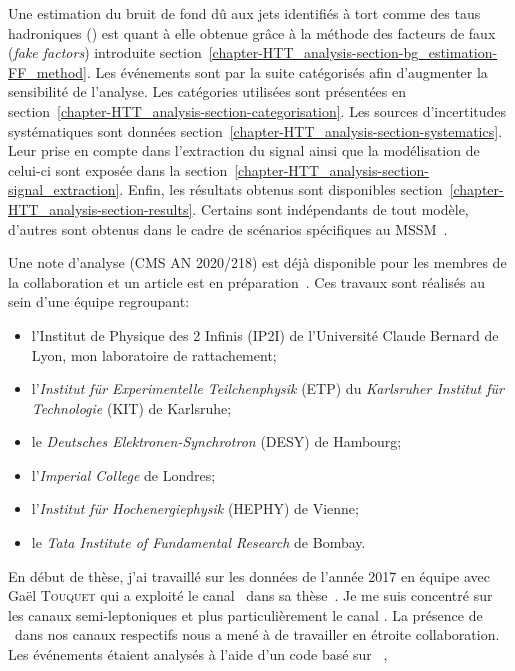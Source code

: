 Une estimation du bruit de fond dû aux jets identifiés à tort comme des taus hadroniques (\ftauhs) est quant à elle obtenue grâce à la méthode des facteurs de faux (\emph{fake factors}) introduite section~\ref{chapter-HTT_analysis-section-bg_estimation-FF_method}.
Les événements sont par la suite catégorisés afin d'augmenter la sensibilité de l'analyse.
Les catégories utilisées sont présentées en section~\ref{chapter-HTT_analysis-section-categorisation}.
Les sources d'incertitudes systématiques sont données section~\ref{chapter-HTT_analysis-section-systematics}.
Leur prise en compte dans l'extraction du signal ainsi que la modélisation de celui-ci sont exposée dans la section~\ref{chapter-HTT_analysis-section-signal_extraction}.
Enfin, les résultats obtenus sont disponibles section~\ref{chapter-HTT_analysis-section-results}.
Certains sont indépendants de tout modèle, d'autres sont obtenus dans le cadre de scénarios spécifiques au MSSM~\cite{Bagnaschi_2019}.
\par
Une note d'analyse (CMS AN 2020/218) \cite{CMS-NOTE-2020-218} est déjà disponible pour les membres de la collaboration et un article est en préparation~\cite{HIG-21-001}.
Ces travaux sont réalisés au sein d'une équipe regroupant:
\begin{itemize}
\item l'Institut de Physique des 2 Infinis (IP2I) de l'Université Claude Bernard de Lyon, mon laboratoire de rattachement;
\item l'\emph{Institut für Experimentelle Teilchenphysik} (ETP) du \emph{Karlsruher Institut für Technologie} (KIT) de Karlsruhe;
\item le \emph{Deutsches Elektronen-Synchrotron} (DESY) de Hambourg;
\item l'\emph{Imperial College} de Londres;
\item l'\emph{Institut für Hochenergiephysik} (HEPHY)
 de Vienne;
\item le \emph{Tata Institute of Fundamental Research} de Bombay.
\end{itemize}
\par
En début de thèse, j'ai travaillé sur les données de l'année 2017 en équipe avec Gaël \textsc{Touquet} qui a exploité le canal \tauh\tauh\ dans sa thèse~\cite{Gael_thesis}.
Je me suis concentré sur les  canaux semi-leptoniques et plus particulièrement le canal \mu\tauh.
La présence de \tauh\ dans nos canaux respectifs nous a mené à de travailler en étroite collaboration.
Les événements étaient analysés à l'aide d'un code basé sur \HEPPY~\cite{heppy},
